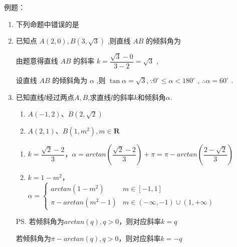 例题：
\begin{enumerate}
    \item 下列命题中错误的是
    \item 已知点 $A\left( {2,0}\right) ,B\left( {3,\sqrt{3}}\right)$ ,则直线 ${AB}$ 的倾斜角为
    \begin{jieda}
        由题意得直线 ${AB}$ 的斜率 $k = \dfrac{\sqrt{3} - 0}{3 - 2} = \sqrt{3}$ ,

        设直线 ${AB}$ 的倾斜角为 $\alpha$ ,则 $\tan \alpha  = \sqrt{3},\because {0}^{ \circ  } \leq  \alpha  < {180}^{ \circ  }$ , $\therefore \alpha  = {60}^{ \circ  }$ .
    \end{jieda}
    \item 已知直线$l$经过两点$A, B$,求直线$l$的斜率$k$和倾斜角$\alpha$.
    \begin{enumerate}
        \item $A(-1, 2)$、$B(2, \sqrt{2})$
        \item $A(2, 1)$、$B(1, m^2), m \in \mathbf{R}$
    \end{enumerate}
    \begin{jieda}
        \begin{enumerate}
            \item $k = \dfrac{\sqrt{2}-2}{3}$，$\alpha = arctan\left(\dfrac{\sqrt{2}-2}{3}\right) + \pi = \pi - arctan\left(\dfrac{2-\sqrt{2}}{3}\right)$
            
            \item $k = 1-m^2$，$\alpha = \left \{ \begin{array}{ll}
                 arctan(1-m^2) & m \in [-1, 1] \\
                 \pi - arctan(m^2-1) & m \in (-\infty, -1) \cup (1, +\infty)
            \end{array} \right.$
        \end{enumerate}
        
        \ps 若倾斜角为$arctan(q), q > 0$，则对应斜率$k = q$
        
        若倾斜角为$\pi - arctan(q), q > 0$，则对应斜率$k = -q$
    \end{jieda}
    

\end{enumerate}
